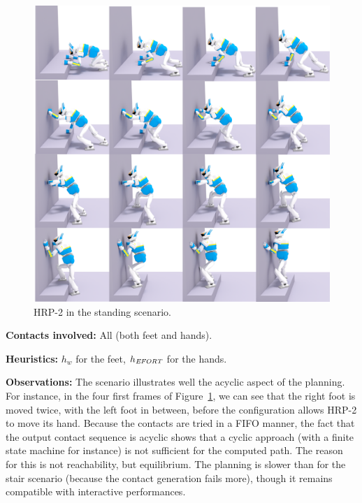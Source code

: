 \begin{figure}
  \centering
  \includegraphics[width=1\linewidth]{figures/standing}
  \caption{
           HRP-2 in the standing scenario. }
		   \label{fig:standing}
\end{figure}


\noindent\textbf{Contacts involved:} All (both feet and hands).

\noindent\textbf{Heuristics:} $h_w$ for the feet, $h_{\textrm{\it EFORT}}$  for the hands.

\noindent\textbf{Observations:} The scenario illustrates well the acyclic aspect of the planning. For instance, in the four first frames of Figure~\ref{fig:standing}, we can see that the right foot
is moved twice, with the left foot in between, before the configuration allows HRP-2 to move its hand.
Because the contacts are tried in a FIFO manner, the fact that the output contact sequence is acyclic shows that a cyclic approach (with a finite state machine for instance) is not sufficient
for the computed path. The reason for this is not reachability, but equilibrium. The planning is slower than for the stair scenario (because the contact generation fails more),
though it remains compatible with \gls{interactive} performances. %


